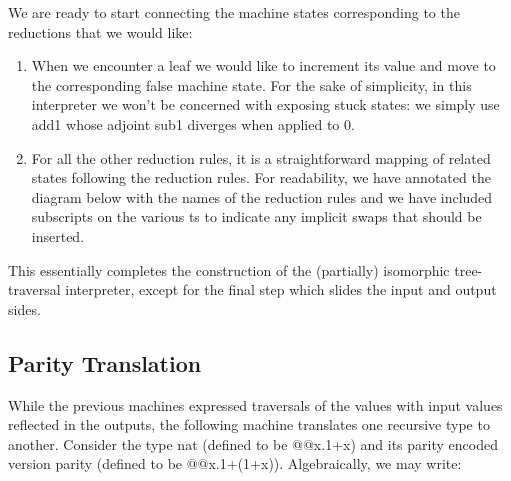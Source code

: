 \documentclass{llncs}
\begin{document}
We are ready to start connecting the machine states corresponding to
the reductions that we would like:
\begin{enumerate}
\item When we encounter a leaf we would like to increment its value and move
  to the corresponding {{false}} machine state. For the sake of simplicity, in
  this interpreter we won't be concerned with exposing stuck states: we
  simply use {{add1}} whose adjoint {{sub1}} diverges when applied to {{0}}.

\item For all the other reduction rules, it is a straightforward mapping of
  related states following the reduction rules. For readability, we have
  annotated the diagram below with the names of the reduction rules and we
  have included subscripts on the various {{t}}s to indicate any implicit
  swaps that should be inserted.

\end{enumerate}


\begin{center}
\end{center}

This essentially completes the construction of the (partially) isomorphic
tree-traversal interpreter, except for the final step which slides the input
and output sides. 


\subsection{Parity Translation }
\label{sec:parity-int}

While the previous machines expressed traversals of the values with
input values reflected in the outputs, the following machine
translates one recursive type to another. Consider the type {{nat}}
(defined to be {{@@x.1+x}}) and its parity encoded version {{parity}}
(defined to be {{@@x.1+(1+x)}}). Algebraically, we may write:

\end{document}
